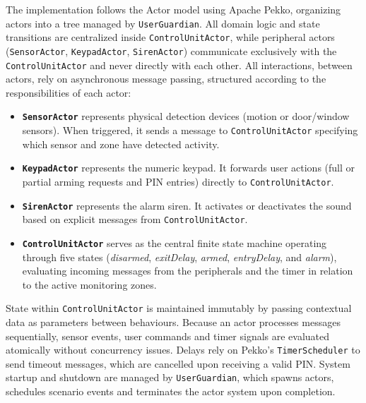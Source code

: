 \documentclass[11pt,a4paper]{article}
\begin{document}
The implementation follows the Actor model using Apache Pekko, organizing actors into a tree managed by \texttt{UserGuardian}. All domain logic and state transitions are centralized inside \texttt{ControlUnitActor}, while peripheral actors (\texttt{SensorActor}, \texttt{KeypadActor}, \texttt{SirenActor}) communicate exclusively with the \texttt{ControlUnitActor} and never directly with each other. All interactions, between actors, rely on asynchronous message passing, structured according to the responsibilities of each actor:
\begin{itemize}
	\item \textbf{\texttt{SensorActor}} represents physical detection devices (motion or door/window sensors). When triggered, it sends a message to \texttt{ControlUnitActor} specifying which sensor and zone have detected activity.
	\item \textbf{\texttt{KeypadActor}} represents the numeric keypad. It forwards user actions (full or partial arming requests and PIN entries) directly to \texttt{ControlUnitActor}.
	\item \textbf{\texttt{SirenActor}} represents the alarm siren. It activates or deactivates the sound based on explicit messages from \texttt{ControlUnitActor}.
	\item \textbf{\texttt{ControlUnitActor}} serves as the central finite state machine operating through five states (\emph{disarmed}, \emph{exitDelay}, \emph{armed}, \emph{entryDelay}, and \emph{alarm}), evaluating incoming messages from the peripherals and the timer in relation to the active monitoring zones.
\end{itemize}

State within \texttt{ControlUnitActor} is maintained immutably by passing contextual data as parameters between behaviours. Because an actor processes messages sequentially, sensor events, user commands and timer signals are evaluated atomically without concurrency issues. Delays rely on Pekko's \texttt{TimerScheduler} to send timeout messages, which are cancelled upon receiving a valid PIN. System startup and shutdown are managed by \texttt{UserGuardian}, which spawns actors, schedules scenario events and terminates the actor system upon completion.
\end{document}
